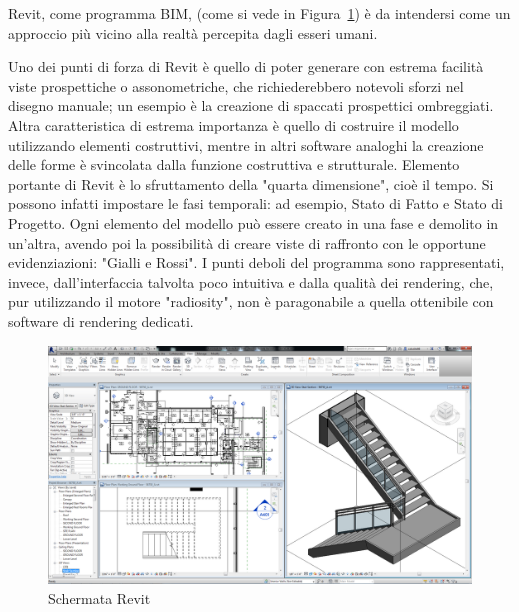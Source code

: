 Revit, come programma BIM,  (come si vede in Figura~\ref{fig:revit}) è da intendersi come un approccio più vicino alla realtà percepita dagli esseri umani.

Uno dei punti di forza di Revit è quello di poter generare con estrema facilità viste prospettiche o assonometriche, che richiederebbero notevoli sforzi nel disegno manuale; un esempio è la creazione di spaccati prospettici ombreggiati. Altra caratteristica di estrema importanza è quello di costruire il modello utilizzando elementi costruttivi, mentre in altri software analoghi la creazione delle forme è svincolata dalla funzione costruttiva e strutturale. Elemento portante di Revit è lo sfruttamento della "quarta dimensione", cioè il tempo. Si possono infatti impostare le fasi temporali: ad esempio, Stato di Fatto e Stato di Progetto. Ogni elemento del modello può essere creato in una fase e demolito in un'altra, avendo poi la possibilità di creare viste di raffronto con le opportune evidenziazioni: "Gialli e Rossi". I punti deboli del programma sono rappresentati, invece, dall'interfaccia talvolta poco intuitiva e dalla qualità dei rendering, che, pur utilizzando il motore "radiosity", non è paragonabile a quella ottenibile con software di rendering dedicati.

\begin{figure}[htbp] %
   \centering
   \includegraphics[width=1\linewidth]{images/revit}
   \caption{Schermata Revit}
   \label{fig:revit}
   \end{figure}
   \newpage
